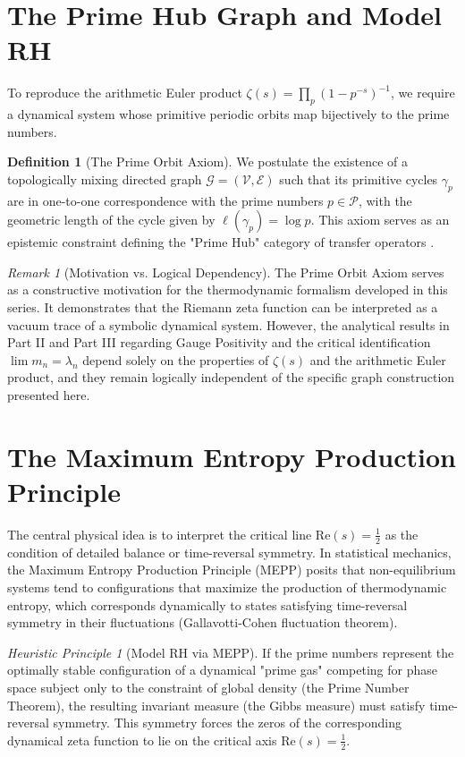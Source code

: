 \documentclass[12pt,a4paper]{article}
\theoremstyle{definition}
\newtheorem{definition}[theorem]{Definition}
\theoremstyle{remark}
\newtheorem{remark}[theorem]{Remark}
\newtheorem{heuristic}[theorem]{Heuristic Principle}
\begin{document}
\section{The Prime Hub Graph and Model RH}

To reproduce the arithmetic Euler product $\zeta(s) = \prod_p (1-p^{-s})^{-1}$, we require a dynamical system whose primitive periodic orbits map bijectively to the prime numbers.

\begin{definition}[The Prime Orbit Axiom]
We postulate the existence of a topologically mixing directed graph $\mathcal{G} = (\mathcal{V}, \mathcal{E})$ such that its primitive cycles $\gamma_p$ are in one-to-one correspondence with the prime numbers $p \in \mathcal{P}$, with the geometric length of the cycle given by $\ell(\gamma_p) = \log p$. This axiom serves as an epistemic constraint defining the "Prime Hub" category of transfer operators \cite{Geiger2026_FSTRH}.
\end{definition}

\begin{remark}[Motivation vs. Logical Dependency]
The Prime Orbit Axiom serves as a constructive motivation for the thermodynamic formalism developed in this series. It demonstrates that the Riemann zeta function can be interpreted as a vacuum trace of a symbolic dynamical system. However, the analytical results in Part II and Part III regarding Gauge Positivity and the critical identification $\lim m_n = \lambda_n$ depend solely on the properties of $\zeta(s)$ and the arithmetic Euler product, and they remain logically independent of the specific graph construction presented here.
\end{remark}

\section{The Maximum Entropy Production Principle}

The central physical idea is to interpret the critical line $\text{Re}(s) = \frac{1}{2}$ as the condition of detailed balance or time-reversal symmetry.
In statistical mechanics, the Maximum Entropy Production Principle (MEPP) posits that non-equilibrium systems tend to configurations that maximize the production of thermodynamic entropy, which corresponds dynamically to states satisfying time-reversal symmetry in their fluctuations (Gallavotti-Cohen fluctuation theorem).

\begin{heuristic}[Model RH via MEPP]
If the prime numbers represent the optimally stable configuration of a dynamical "prime gas" competing for phase space subject only to the constraint of global density (the Prime Number Theorem), the resulting invariant measure (the Gibbs measure) must satisfy time-reversal symmetry. This symmetry forces the zeros of the corresponding dynamical zeta function to lie on the critical axis $\text{Re}(s) = \frac{1}{2}$.
\end{heuristic}
\end{document}
